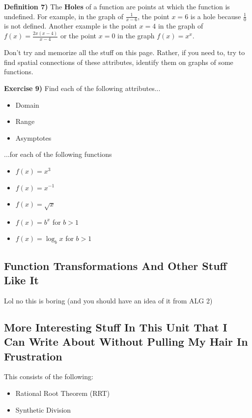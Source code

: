 \documentclass[a4paper]{article}
\begin{document}
\textbf{Definition 7)} The \textbf{Holes} of a function are points at which the function is undefined. For example, in the graph of $\frac{1}{x-6}$, the point $x=6$ is a hole because $\frac{1}{0}$ is not defined. Another example is the point $x=4$ in the graph of $f(x)=\frac{2x(x-4)}{x-4}$ or the point $x=0$ in the graph $f(x)=x^x$.

Don't try and memorize all the stuff on this page. Rather, if you need to, try to find spatial connections of these attributes, identify them on graphs of some functions.

\textbf{Exercise 9)} Find each of the following attributes...
\begin{itemize}
    \item Domain
    \item Range
    \item Asymptotes
\end{itemize}
...for each of the following functions
\begin{itemize}
    \item $f(x)=x^3$
    \item $f(x)=x^{-1}$
    \item $f(x)=\sqrt{x}$
    \item $f(x)=b^x$ for $b>1$
    \item $f(x)=\log_{b}{x}$ for $b>1$
\end{itemize}

\subsection{Function Transformations And Other Stuff Like It}

Lol no this is boring (and you should have an idea of it from ALG 2)

\subsection{More Interesting Stuff In This Unit That I Can Write About Without Pulling My Hair In Frustration}

This consists of the following:
\begin{itemize}
    \item Rational Root Theorem (RRT)
    \item Synthetic Division
\end{itemize}
\end{document}

